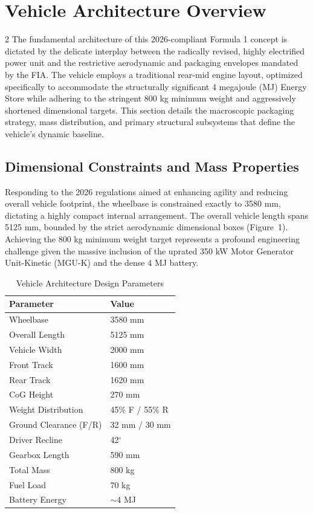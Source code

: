 \clearpage
\section{Vehicle Architecture Overview}

\begin{multicols}{2}
The fundamental architecture of this 2026-compliant Formula 1 concept is dictated by the delicate interplay between the radically revised, highly electrified power unit and the restrictive aerodynamic and packaging envelopes mandated by the FIA. The vehicle employs a traditional rear-mid engine layout, optimized specifically to accommodate the structurally significant 4 megajoule (MJ) Energy Store while adhering to the stringent 800 kg minimum weight and aggressively shortened dimensional targets. This section details the macroscopic packaging strategy, mass distribution, and primary structural subsystems that define the vehicle's dynamic baseline.

\subsection{Dimensional Constraints and Mass Properties}

Responding to the 2026 regulations aimed at enhancing agility and reducing overall vehicle footprint, the wheelbase is constrained exactly to 3580 mm, dictating a highly compact internal arrangement. The overall vehicle length spans 5125 mm, bounded by the strict aerodynamic dimensional boxes (Figure~1). Achieving the 800 kg minimum weight target represents a profound engineering challenge given the massive inclusion of the uprated 350 kW Motor Generator Unit-Kinetic (MGU-K) and the dense 4 MJ battery. 
\end{multicols}

\begin{table}[H]
\centering
\caption{Vehicle Architecture Design Parameters}
\vspace{0.2cm}
\begin{tabularx}{\textwidth}{@{}XX@{}}
\toprule
\textbf{Parameter} & \textbf{Value} \\
\midrule
Wheelbase & 3580 mm \\
Overall Length & 5125 mm \\
Vehicle Width & 2000 mm \\
Front Track & 1600 mm \\
Rear Track & 1620 mm \\
CoG Height & 270 mm \\
Weight Distribution & 45\% F / 55\% R \\
Ground Clearance (F/R) & 32 mm / 30 mm \\
Driver Recline & 42$^\circ$ \\
Gearbox Length & 590 mm \\
Total Mass & 800 kg \\
Fuel Load & 70 kg \\
Battery Energy & $\sim$4 MJ \\
\bottomrule
\end{tabularx}
\label{tab:architecture_params}
\end{table}

